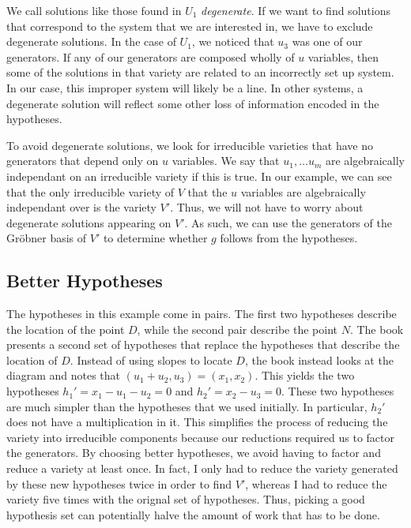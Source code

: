 \documentclass{article}
\theoremstyle{plain}
\theoremstyle{definition}
\theoremstyle{remark}
\newcommand{\gro}{Gr\"obner }
\begin{document}
We call solutions like those found in $U_1$ \textit{degenerate}. If we want to find solutions that correspond to the system that we are interested in, we have to exclude degenerate solutions.
In the case of $U_1$, we noticed that $u_3$ was one of our generators. 
If any of our generators are composed wholly of $u$ variables, then some of the solutions in that variety are related to an incorrectly set up system.
In our case, this improper system will likely be a line.
In other systems, a degenerate solution will reflect some other loss of information encoded in the hypotheses.

To avoid degenerate solutions, we look for irreducible varieties that have no generators that depend only on $u$ variables. 
We say that $u_1,\dots u_m$ are algebraically independant on an irreducible variety if this is true.
In our example, we can see that the only irreducible variety of $V$ that the $u$ variables are algebraically independant over is the variety $V'$.
Thus, we will not have to worry about degenerate solutions appearing on $V'$. 
As such, we can use the generators of the \gro basis of $V'$ to determine whether $g$ follows from the hypotheses.


\subsection{Better Hypotheses}
The hypotheses in this example come in pairs. The first two hypotheses describe the location of the point $D$, while the second pair describe the point $N$.
The book presents a second set of hypotheses that replace the hypotheses that describe the location of $D$.
Instead of using slopes to locate $D$, the book instead looks at the diagram and notes that $(u_1 + u_2,u_3) = (x_1,x_2)$. 
This yields the two hypotheses $h_1'= x_1 - u_1 - u_2 = 0$ and $h_2'= x_2-u_3 = 0$. These two hypotheses are much simpler than the hypotheses that we used initially.
In particular, $h_2'$ does not have a multiplication in it. 
This simplifies the process of reducing the variety into irreducible components because our reductions required us to factor the generators.
By choosing better hypotheses, we avoid having to factor and reduce a variety at least once. 
In fact, I only had to reduce the variety generated by these new hypotheses twice in order to find $V'$, whereas I had to reduce the variety five times with the orignal set of hypotheses.
Thus, picking a good hypothesis set can potentially halve the amount of work that has to be done.
\end{document}
